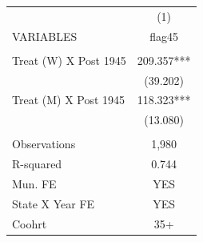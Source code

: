 \begin{tabular}{lc} \hline
 & (1) \\
VARIABLES & flag45 \\ \hline
 &  \\
Treat (W) X Post 1945 & 209.357*** \\
 & (39.202) \\
Treat (M) X Post 1945 & 118.323*** \\
 & (13.080) \\
 &  \\
Observations & 1,980 \\
R-squared & 0.744 \\
Mun. FE & YES \\
State X Year FE & YES \\
 Coohrt & 35+ \\ \hline
\end{tabular}

